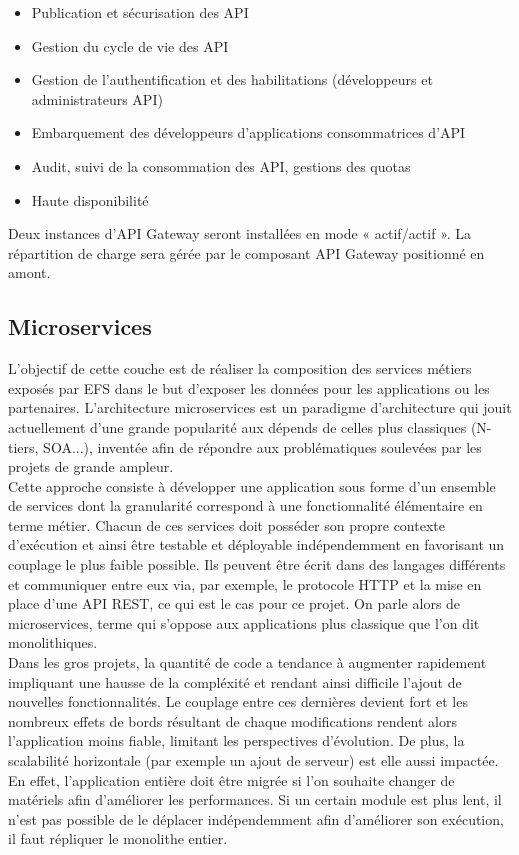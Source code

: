 	\begin{itemize}
		\item Publication et sécurisation des API
		\item Gestion du cycle de vie des API
		\item Gestion de l’authentification et des habilitations (développeurs et administrateurs API)
		\item Embarquement des développeurs d’applications consommatrices d’API
		\item Audit, suivi de la consommation des API, gestions des quotas
		\item Haute disponibilité \\
	\end{itemize}

Deux instances d’API Gateway seront installées en mode « actif/actif ». La répartition de charge sera gérée par le composant API Gateway positionné en amont.
	
\subsection{Microservices}

	L'objectif de cette couche est de réaliser la composition des services métiers exposés par EFS dans le but d'exposer les données pour les applications ou les partenaires. L'architecture microservices est un paradigme d'architecture qui jouit actuellement d'une grande popularité aux dépends de celles plus classiques (N-tiers, SOA...), inventée afin de répondre aux problématiques soulevées par les projets de grande ampleur. \\
	
	Cette approche consiste à développer une application sous forme d'un ensemble de services dont la granularité correspond à une fonctionnalité élémentaire en terme métier. Chacun de ces services doit posséder son propre contexte d'exécution et ainsi être testable et déployable indépendemment en favorisant un couplage le plus faible possible. Ils peuvent être écrit dans des langages différents et communiquer entre eux via, par exemple, le protocole HTTP et la mise en place d'une API REST, ce qui est le cas pour ce projet. On parle alors de microservices, terme qui s'oppose aux applications plus classique que l'on dit monolithiques.\\
	
	Dans les gros projets, la quantité de code a tendance à augmenter rapidement impliquant une hausse de la compléxité et rendant ainsi difficile l'ajout de nouvelles fonctionnalités. Le couplage entre ces dernières devient fort et les nombreux effets de bords résultant de chaque modifications rendent alors l'application moins fiable, limitant les perspectives d'évolution. De plus, la scalabilité horizontale (par exemple un ajout de serveur) est elle aussi impactée. En effet, l'application entière doit être migrée si l'on souhaite changer de matériels afin d'améliorer les performances. Si un certain module est plus lent, il n'est pas possible de le déplacer indépendemment afin d'améliorer son exécution, il faut répliquer le monolithe entier.
	
